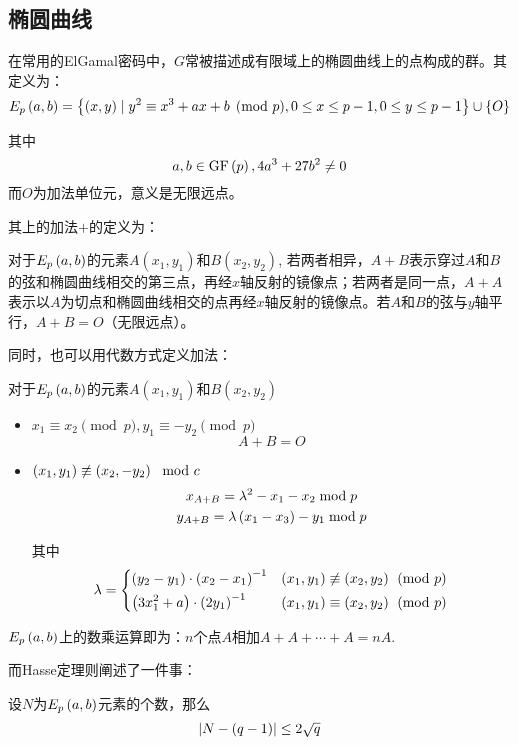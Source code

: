 \subsection{椭圆曲线}
在常用的ElGamal密码中，$G$常被描述成有限域上的椭圆曲线上的点构成的群。其定义为：
\begin{equation}
E_p\left( {a, b}\right)=\left\{ {\left( {x, y}\right)\mid y^2\equiv x^3+ax+b\pmod{p}, 0\leq x\leq p-1, 0\leq y\leq p-1} \right\}\cup \left\{ {O} \right\}
\end{equation}

其中
\[a,b\in\mathrm{GF}\left( {p}\right), 4a^3+27b^2\neq 0\]
而$O$为加法单位元，意义是无限远点。\par
其上的加法$+$的定义为：\par
对于$E_p\left( {a, b}\right)$的元素$A(x_1, y_1)$和$B(x_2, y_2)$, 若两者相异，$A+B$表示穿过$A$和$B$的弦和椭圆曲线相交的第三点，再经$x$轴反射的镜像点；若两者是同一点，$A+A$表示以$A$为切点和椭圆曲线相交的点再经$x$轴反射的镜像点。若$A$和$B$的弦与$y$轴平行，$A+B=O$（无限远点）。\par
同时，也可以用代数方式定义加法：\par
对于$E_p\left( {a, b}\right)$的元素$A(x_1, y_1)$和$B(x_2, y_2)$
\begin{itemize}
	\item $x_1\equiv x_2\pmod{p}, y_1\equiv -y_2\pmod{p}$
	\[A+B=O\]
	\item $\left( {x_1, y_1}\right)\not\equiv\left( {x_2, -y_2}\right)\mod{c}$
	\begin{gather}
	x_{A+B}=\lambda^2-x_1-x_2\bmod{p}\\
	y_{A+B}=\lambda\left( {x_1-x_3}\right)-y_1\bmod{p}
	\end{gather}

	其中
	\begin{equation}
	\lambda=\begin{dcases}\left( {y_2-y_1}\right)\cdot\left( {x_2-x_1}\right)^{-1}&\left( {x_1, y_1}\right)\not\equiv \left( {x_2, y_2}\right)\pmod{p}\\\left( {3x_1^2+a}\right)\cdot\left( {2y_1}\right)^{-1}&\left( {x_1, y_1}\right)\equiv\left( {x_2, y_2}\right)\pmod{p}\end{dcases}
	\end{equation}
\end{itemize}

$E_p\left( {a, b}\right)$上的数乘运算即为：$n$个点$A$相加$A+A+\cdots +A=nA$.\par
而Hasse定理则阐述了一件事：
\begin{theorem}
设$N$为$E_p\left( {a,b}\right)$元素的个数，那么
\begin{equation}
\left| N-\left( {q-1}\right) \right|\leq 2\sqrt{q}
\end{equation}
\end{theorem}

